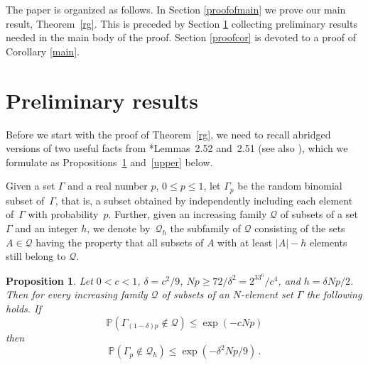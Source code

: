 \documentclass[reqno, 12pt]{amsart}
\newcommand{\PP}{\mathds{P}}
\newtheorem{prop}[theorem]{Proposition}
\def\PP{\mathds P}
\begin{document}
The paper is organized as follows. In Section \ref{proofofmain} we prove our main result, Theorem~\ref{rg}. This is preceded by Section \ref{prem} collecting preliminary results needed in  the main body of the proof.
 Section \ref{proofcor} is devoted to  a   proof of Corollary \ref{main}.


\section{Preliminary results}\label{prem}
Before we start with  the proof of Theorem~\ref{rg}, we need to recall abridged versions of two useful facts from \cite{JLR}*{Lemmas~2.52 and~2.51}
(see also \cites{rr,rrs}), which we formulate as Propositions~\ref{del} and~\ref{upper} below.

Given a set $\Gamma$ and a real number $p$, $0\le p\le 1$, let $\Gamma_p$ be the random binomial
subset of~$\Gamma$, that is, a subset obtained by independently including each element of~$\Gamma$
with probability~$p$. Further, given an increasing family $\mathcal Q$ of subsets of a set $\Gamma$
and an integer $h$, we denote by~$\mathcal Q_h$ the subfamily of $\mathcal Q$ consisting of the
sets $A\in \mathcal Q$ having the property that  all  subsets of $A$ with at least $|A|-h$ elements
still belong to $\mathcal Q$.


\begin{prop}\label{del}
Let $0<c<1$, $\delta=c^2/9$,  $Np\ge 72/\delta^2=2^33^6/c^4$, and $h=\delta Np/2$.
Then for every increasing family $\mathcal Q$ of subsets of an $N$-element set $\Gamma$ the following holds.
If
$$
\PP\left(\Gamma_{(1-\delta)p}\not\in\mathcal Q\right)\le\exp(-cNp)
$$
then
$$
\PP\left(\Gamma_p\not\in\mathcal{Q}_h\right)\le\exp(-\delta^2Np/9)\,.
$$
\end{prop}
\end{document}
